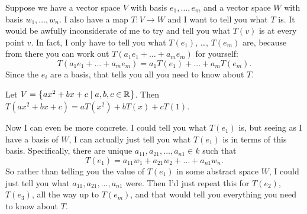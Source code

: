 Suppose we have a vector space $V$ with basis $e_1, \dots, e_m$
and a vector space $W$ with basis $w_1, \dots, w_n$.
I also have a map $T : V \to W$ and I want to tell you what $T$ is.
It would be awfully inconsiderate of me to try and tell you what $T(v)$
is at every point $v$.
In fact, I only have to tell you what $T(e_1)$, \dots, $T(e_m)$ are,
because from there you can work out $T(a_1e_1 + \dots + a_me_m)$ for yourself:
\[ T(a_1e_1 + \dots + a_me_m) = a_1T(e_1) + \dots + a_mT(e_m). \]
Since the $e_i$ are a basis, that tells you all you need to know about $T$.
\begin{example}
	Let $V = \left\{ ax^2+bx+c \mid a,b,c \in \mathbb R \right\}$.
	Then $T(ax^2+bx+c) = aT(x^2) + bT(x) + cT(1)$.
\end{example}

Now I can even be more concrete.
I could tell you what $T(e_1)$ is, but seeing as I have a basis of $W$,
I can actually just tell you what $T(e_1)$ is in terms of this basis.
Specifically, there are unique $a_{11}, a_{21}, \dots, a_{n1} \in k$ such that
\[ T(e_1) = a_{11} w_1 + a_{21} w_2 + \dots + a_{n1} w_n. \]
So rather than telling you the value of $T(e_1)$ in some abstract space $W$,
I could just tell you what $a_{11}, a_{21}, \dots, a_{n1}$ were.
Then I'd just repeat this for $T(e_2)$, $T(e_3)$, all the way up to $T(e_m)$,
and that would tell you everything you need to know about $T$.

